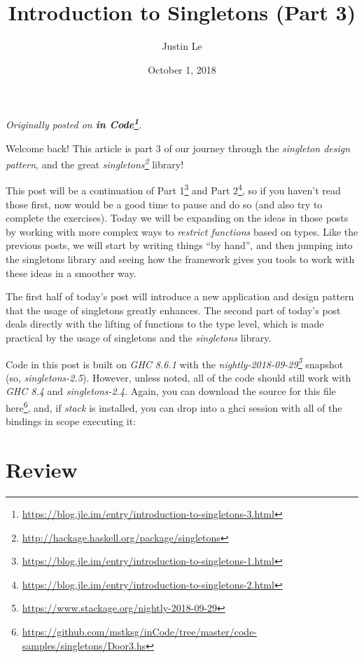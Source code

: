 \documentclass[]{article}
\title{Introduction to Singletons (Part 3)}
\author{Justin Le}
\date{October 1, 2018}
\newenvironment{Shaded}{}{}
\newcommand{\ExtensionTok}[1]{#1}
\newcommand{\NormalTok}[1]{#1}
\renewcommand{\href}[2]{#2\footnote{\url{#1}}}
\begin{document}
\maketitle

\emph{Originally posted on
\textbf{\href{https://blog.jle.im/entry/introduction-to-singletons-3.html}{in
Code}}.}

Welcome back! This article is part 3 of our journey through the \emph{singleton
design pattern}, and the great
\emph{\href{http://hackage.haskell.org/package/singletons}{singletons}} library!

This post will be a continuation of
\href{https://blog.jle.im/entry/introduction-to-singletons-1.html}{Part 1} and
\href{https://blog.jle.im/entry/introduction-to-singletons-2.html}{Part 2}, so
if you haven't read those first, now would be a good time to pause and do so
(and also try to complete the exercises). Today we will be expanding on the
ideas in those posts by working with more complex ways to \emph{restrict
functions} based on types. Like the previous posts, we will start by writing
things ``by hand'', and then jumping into the singletons library and seeing how
the framework gives you tools to work with these ideas in a smoother way.

The first half of today's post will introduce a new application and design
pattern that the usage of singletons greatly enhances. The second part of
today's post deals directly with the lifting of functions to the type level,
which is made practical by the usage of singletons and the \emph{singletons}
library.

Code in this post is built on \emph{GHC 8.6.1} with the
\emph{\href{https://www.stackage.org/nightly-2018-09-29}{nightly-2018-09-29}}
snapshot (so, \emph{singletons-2.5}). However, unless noted, all of the code
should still work with \emph{GHC 8.4} and \emph{singletons-2.4}. Again, you can
download the source for this file
\href{https://github.com/mstksg/inCode/tree/master/code-samples/singletons/Door3.hs}{here},
and, if \emph{stack} is installed, you can drop into a ghci session with all of
the bindings in scope executing it:

\begin{Shaded}
\end{Shaded}

\hypertarget{review}{%
\section{Review}\label{review}}
\end{document}
